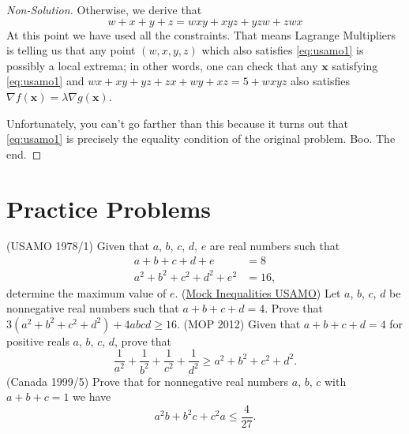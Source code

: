 \documentclass[11pt]{scrartcl}
\begin{document}
\begin{proof}[Non-Solution]
  Otherwise, we derive that
  \begin{equation}
    w+x+y+z = wxy+xyz+yzw+zwx
    \label{eq:usamo1}
  \end{equation}
  At this point we have used all the constraints.
  That means Lagrange Multipliers is telling us that any point $(w,x,y,z)$
  which also satisfies \eqref{eq:usamo1} is possibly a local extrema;
  in other words, one can check that any $\mathbf{x}$ satisfying \eqref{eq:usamo1}
  and $wx+xy+yz+zx+wy+xz = 5+wxyz$ also satisfies
  $\nabla f(\mathbf{x}) = \lambda \nabla g(\mathbf{x})$.

  Unfortunately, you can't go farther than this because it turns out
  that \eqref{eq:usamo1} is precisely the equality condition of the original problem.
  Boo. The end.
\end{proof}

\section{Practice Problems}
\begin{enumerate}
  \ii (USAMO 1978/1) Given that $a$, $b$, $c$, $d$, $e$ are real numbers such that
  \begin{align*}
    a+b+c+d+e &= 8 \\
    a^2+b^2+c^2+d^2+e^2 &= 16,
  \end{align*}
  determine the maximum value of $e$.
  \ii (\href{http://www.aops.com/community/h492263}{Mock Inequalities USAMO})
  Let $a$, $b$, $c$, $d$ be nonnegative real numbers such that $a+b+c+d=4$.
  Prove that $3(a^2+b^2+c^2+d^2) + 4abcd \ge 16$.
  \ii (MOP 2012) Given that $a+b+c+d=4$ for positive reals $a$, $b$, $c$, $d$, prove that
  \[ \frac{1}{a^2} + \frac{1}{b^2} + \frac{1}{c^2} + \frac{1}{d^2}
    \ge a^2+b^2+c^2+d^2. \]
  \ii (Canada 1999/5) Prove that for nonnegative real numbers $a$, $b$, $c$
  with $a+b+c=1$ we have \[ a^2b + b^2c + c^2a \le \frac{4}{27}. \]
\end{enumerate}
\end{document}
